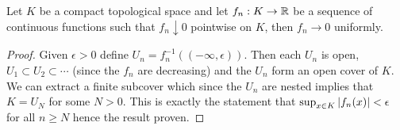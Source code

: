 \begin{lem}\label{DinisTheorem}Let $K$ be a compact
  topological space and let $f_n: K \to \mathbb{R}$ be a sequence  of continuous
  functions such that $f_n \downarrow 0$ pointwise on $K$, then $f_n
  \to 0$ uniformly.
\end{lem}
\begin{proof}
Given $\epsilon > 0$ define $U_n = f_n^{-1}((-\infty,\epsilon))$.
Then each
$U_n$ is open, $U_1 \subset U_2 \subset \dotsb$ (since the $f_n$ are
decreasing) and the $U_n$ form an open cover of $K$.  We can extract a
finite subcover which since the $U_n$ are nested implies that $K =
U_N$ for some $N > 0$.  This is exactly the statement that $\sup_{x
  \in K} \left \vert f_n(x) \right \vert < \epsilon$ for all $n \geq N$ hence the result proven.
\end{proof}

